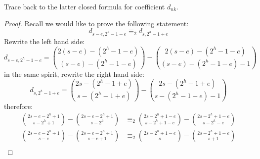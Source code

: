 \documentclass[11pt,a4paper]{article} %
\begin{document}
    Trace back to the latter closed formula for coefficient $d_{nk}$. 
    \begin{proof}
    Recall we would like to prove the following statement:
    \begin{displaymath}
        d_{s-e,2^{h}-1-e} \equiv_{2} d_{s,2^{h}-1+e}
    \end{displaymath}
    Rewrite the left hand side:
    \begin{displaymath}
        d_{s-e,2^{h}-1-e}= {{2(s-e)-(2^{h}-1-e)}\choose{(s-e)-(2^{h}-1-e)}}
            - {{2(s-e)-(2^{h}-1-e)}\choose{(s-e)-(2^{h}-1-e)-1}}
    \end{displaymath}
    in the same spirit, rewrite the right hand side:
    \begin{displaymath}
        d_{s,2^{h}-1+e}={{2s-(2^{h}-1+e)}\choose{s-(2^{h}-1+e)}}
            - {{2s-(2^{h}-1+e)}\choose{s-(2^{h}-1+e)-1}}
    \end{displaymath}
    therefore:
    \begin{displaymath}
        \begin{split}
            {{2s-e-2^{h}+1}\choose{s-2^{h}+1}}
                - {{2s-e-2^{h}+1}\choose{s-2^{h}}}
            &\equiv_{2}
            {{2s-2^{h}+1-e}\choose{s-2^{h}+1-e}}
                - {{2s-2^{h}+1-e}\choose{s-2^{h}-e}}\\
            {{2s-e-2^{h}+1}\choose{s-e}}
                - {{2s-e-2^{h}+1}\choose{s-e+1}}
            &\equiv_{2}
            {{2s-2^{h}+1-e}\choose{s}}
                - {{2s-2^{h}+1-e}\choose{s+1}}\\
        \end{split}
    \end{displaymath}


\end{proof}
\end{document}
